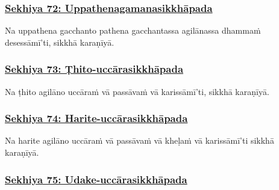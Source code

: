 \subsubsection*{\hyperref[training72]{Sekhiya 72: Uppathenagamanasikkhāpada}}
\label{sekh72}

Na uppathena\makeatletter\hyperlink{endnote522-appendix}\makeatother{} gacchanto pathena gacchantassa agilānassa dhammaṁ desessāmī'ti, sikkhā karaṇīyā.\makeatletter\hyperlink{endnote523-appendix}\makeatother{}



\subsubsection*{\hyperref[training73]{Sekhiya 73: Ṭhito-uccārasikkhāpada}}
\label{sekh73}

Na ṭhito agilāno\makeatletter\hyperlink{endnote524-appendix}\makeatother{} uccāraṁ vā passāvaṁ vā karissāmī'ti, sikkhā karaṇīyā.



\subsubsection*{\hyperref[training74]{Sekhiya 74: Harite-uccārasikkhāpada}}
\label{sekh74}

Na harite agilāno uccāraṁ vā passāvaṁ vā kheḷaṁ vā karissāmī'ti sikkhā karaṇīyā.



\subsubsection*{\hyperref[training75]{Sekhiya 75: Udake-uccārasikkhāpada}}
\label{sekh75}

